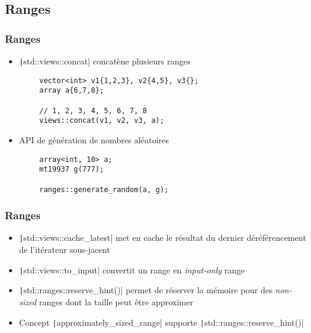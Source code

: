 \documentclass[C++.tex]{subfiles}
\begin{document}
\subsection*{Ranges}
\begin{frame}[fragile]
	\frametitle{Ranges}
	\begin{itemize}
		\item \texttt|std::views::concat| concatène plusieurs ranges
	\end{itemize}

	\begin{verbatim}
		vector<int> v1{1,2,3}, v2{4,5}, v3{};
		array a{6,7,8};

		// 1, 2, 3, 4, 5, 6, 7, 8
		views::concat(v1, v2, v3, a);
	\end{verbatim}

	\begin{itemize}
		\item API de génération de nombres aléatoires
	\end{itemize}

	\begin{verbatim}
		array<int, 10> a;
		mt19937 g(777);

		ranges::generate_random(a, g);
	\end{verbatim}

\end{frame}

\begin{frame}[fragile]
	\frametitle{Ranges}
	\begin{itemize}
		\item \texttt|std::views::cache_latest| met en cache le résultat du dernier déréférencement de l'itérateur sous-jacent
		\item \texttt|std::views::to_input| convertit un range en \textit{input-only} range
		\item \texttt|std::ranges::reserve_hint()| permet de réserver la mémoire pour des \textit{non-sized} ranges dont la taille peut être approximer
		\item Concept \texttt|approximately_sized_range| supporte \texttt|std::ranges::reserve_hint()|
	\end{itemize}

\end{frame}
\end{document}
